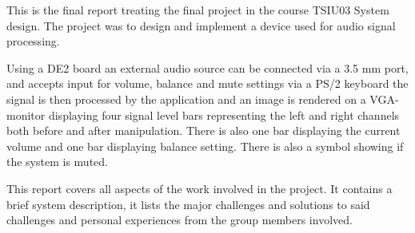 This is the final report treating the final project in the course
TSIU03 System design. The project was to design and implement a device
used for audio signal processing.

Using a DE2 board an external audio source can be connected via a
3.5 mm port, and accepts input for volume, balance and mute settings
via a PS/2 keyboard the signal is then processed by the application
and an image is rendered on a VGA-monitor displaying four signal level
bars representing the left and right channels both before and after
manipulation. There is also one bar displaying the current volume and
one bar displaying balance setting. There is also a symbol showing if
the system is muted.

This report covers all aspects of the work involved in the
project. It contains a brief system description, it lists the
major challenges and solutions to said challenges and personal
experiences from the group members involved.
